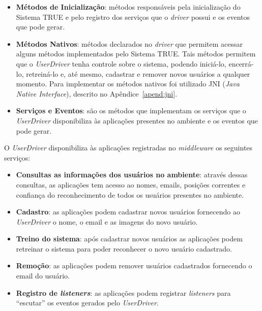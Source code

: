 \begin{itemize}
	\item \textbf{Métodos de Inicialização}: métodos responsáveis pela inicialização do Sistema TRUE e pelo registro dos serviços que o \textit{driver} possui e os eventos que pode gerar.

	\item \textbf{Métodos Nativos}: métodos declarados no \textit{driver} que permitem acessar alguns métodos implementados pelo Sistema TRUE. Tais métodos permitem que o \textit{UserDriver} tenha controle sobre o sistema, podendo iniciá-lo, encerrá-lo, retreiná-lo e, até mesmo, cadastrar e remover novos usuários a qualquer momento. Para implementar os métodos nativos foi utilizado JNI (\textit{Java Native Interface}), descrito no Apêndice~\ref{apend:jni}.

	\item \textbf{Serviços e Eventos}: são os métodos que implementam os serviços que o \textit{UserDriver} disponibiliza às aplicações presentes no ambiente e os eventos que pode gerar. 


\end{itemize}



	O \textit{UserDriver} disponibiliza às aplicações registradas no
	\textit{middleware} os seguintes serviços:

	\begin{itemize}
		\item \textbf{Consultas as informações dos usuários no ambiente}: através dessas consultas, as aplicações tem acesso ao nomes, emails, posições correntes e confiança do reconhecimento de todos os usuários presentes no ambiente.
		\item \textbf{Cadastro}: as aplicações podem cadastrar novos usuários fornecendo ao \textit{UserDriver} o nome, o email e as imagens do novo usuário.
		\item \textbf{Treino do sistema}: após cadastrar novos usuários as aplicações podem retreinar o sistema para poder reconhecer o novo usuário cadastrado.
		\item \textbf{Remoção}: as aplicações podem remover usuários cadastrados fornecendo o email do usuário.
		\item \textbf{Registro de \textit{listeners}}: as aplicações podem registrar \textit{listeners} para ``escutar'' os eventos gerados pelo \textit{UserDriver}.
	\end{itemize}

